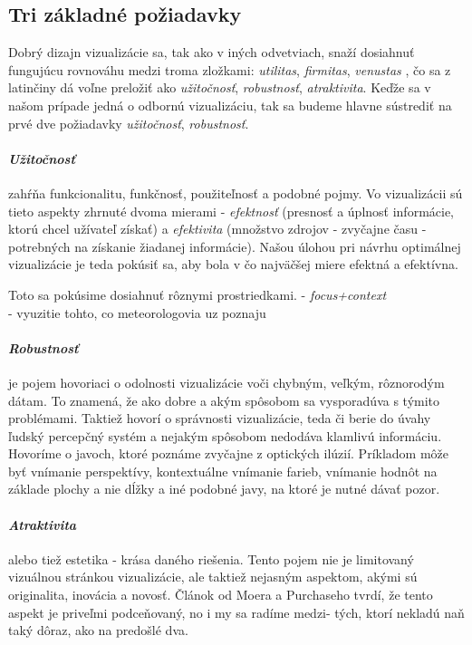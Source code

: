 \subsection{Tri základné požiadavky}
Dobrý dizajn vizualizácie sa, tak ako v iných odvetviach, snaží dosiahnuť fungujúcu rovnováhu medzi troma zložkami: \textit{utilitas}, \textit{firmitas}, \textit{venustas} \cite{XYZ}, čo sa z latinčiny dá voľne preložiť ako \textit{užitočnosť}, \textit{robustnosť}, \textit{atraktivita}. Keďže sa v našom prípade jedná o odbornú vizualizáciu, tak sa budeme hlavne sústrediť na prvé dve požiadavky \textit{užitočnosť}, \textit{robustnosť}.
	
\paragraph{\textit{Užitočnosť}} zahŕňa funkcionalitu, funkčnosť, použiteľnosť a podobné pojmy. Vo vizualizácii sú tieto aspekty zhrnuté dvoma mierami - \textit{efektnosť} (presnosť a úplnosť informácie, ktorú chcel užívateľ získať) a \textit{efektivita} (množstvo zdrojov - zvyčajne času - potrebných na získanie žiadanej informácie). Našou úlohou pri návrhu optimálnej vizualizácie je teda pokúsiť sa, aby bola v čo najväčšej miere efektná a efektívna. 

Toto sa pokúsime dosiahnuť rôznymi prostriedkami. 
- \textit{focus+context} \\
- vyuzitie tohto, co meteorologovia uz poznaju \\


\paragraph{\textit{Robustnosť}} je pojem hovoriaci o odolnosti vizualizácie voči chybným, veľkým, rôznorodým dátam. To znamená, že ako dobre a akým spôsobom sa vysporadúva s týmito problémami. Taktiež hovorí o správnosti vizualizácie, teda či berie do úvahy ľudský percepčný systém a nejakým spôsobom nedodáva klamlivú informáciu. Hovoríme o javoch, ktoré poznáme zvyčajne z optických ilúzií. Príkladom môže byť vnímanie perspektívy, kontextuálne vnímanie farieb, vnímanie hodnôt na základe plochy a nie dĺžky a iné podobné javy, na ktoré je nutné dávať pozor.


\paragraph{\textit{Atraktivita}} alebo tiež estetika - krása daného riešenia. Tento pojem nie je limitovaný vizuálnou stránkou vizualizácie, ale taktiež nejasným aspektom, akými sú originalita, inovácia a novosť. Článok od Moera a Purchaseho \cite{RoleOfDesign} tvrdí, že tento aspekt je priveľmi podceňovaný, no i my sa radíme medzi- tých, ktorí nekladú naň taký dôraz, ako na predošlé dva.


